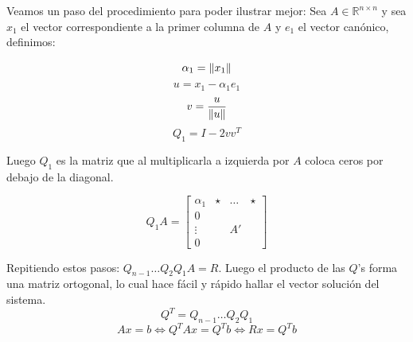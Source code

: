 Veamos un paso del procedimiento para poder ilustrar mejor: Sea $A \in \mathbb{R}^{n \times n}$ y sea $x_1$ el vector correspondiente a la primer columna de $A$ y $e_1$ el vector canónico, definimos:

\[
  \alpha_1 = \left\|x_1\right\|
\]
\[
  u = x_1 - \alpha_1 e_1
\]
\[
  v = \frac{u}{\left\|u\right\|}
\]
\[
  Q_1 = I - 2vv^{T}
\]

Luego $Q_1$ es la matriz que al multiplicarla a izquierda por $A$ coloca ceros por debajo de la diagonal.

\[
  Q_1A = \begin{bmatrix}
   \alpha_1&\star&\dots&\star\\
      0    &     &     &    \\
   \vdots  &     &  A' &    \\
      0    &     &     & \end{bmatrix}
\]

Repitiendo estos pasos: $Q_{n - 1} \dots Q_2Q_1A = R$. Luego el producto de las $Q$'s forma una matriz ortogonal, lo cual hace fácil y rápido hallar el vector solución del sistema.
\[
  Q^T = Q_{n - 1} \dots Q_2Q_1
\]
\[
  Ax = b \iff Q^TAx = Q^Tb \iff Rx = Q^Tb
\]

